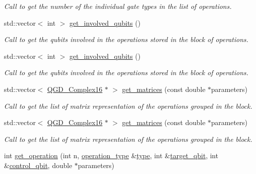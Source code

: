 \begin{DoxyCompactItemize}
\begin{DoxyCompactList}\small\item\em Call to get the number of the individual gate types in the list of operations. \end{DoxyCompactList}\item 
std\+::vector$<$ int $>$ \hyperlink{class_operation__block_a92e4f0566e4b36830652729377a8e936}{get\+\_\+involved\+\_\+qubits} ()
\begin{DoxyCompactList}\small\item\em Call to get the qubits involved in the operations stored in the block of operations. \end{DoxyCompactList}\item 
std\+::vector$<$ int $>$ \hyperlink{class_operation__block_aebdbb71e02ff6826d967d55f4cd4db28}{get\+\_\+involved\+\_\+qubits} ()
\begin{DoxyCompactList}\small\item\em Call to get the qubits involved in the operations stored in the block of operations. \end{DoxyCompactList}\item 
std\+::vector$<$ \hyperlink{struct_q_g_d___complex16}{Q\+G\+D\+\_\+\+Complex16} $\ast$ $>$ \hyperlink{class_operation__block_af3e794fd9a409978a414af539ad23320}{get\+\_\+matrices} (const double $\ast$parameters)
\begin{DoxyCompactList}\small\item\em Call to get the list of matrix representation of the operations grouped in the block. \end{DoxyCompactList}\item 
std\+::vector$<$ \hyperlink{struct_q_g_d___complex16}{Q\+G\+D\+\_\+\+Complex16} $\ast$ $>$ \hyperlink{class_operation__block_aedddbc5242eab7c00125359a835ac53d}{get\+\_\+matrices} (const double $\ast$parameters)
\begin{DoxyCompactList}\small\item\em Call to get the list of matrix representation of the operations grouped in the block. \end{DoxyCompactList}\item 
int \hyperlink{class_decomposition___base_a64e2b692d38fe3ccbd49708d8fa24493}{get\+\_\+operation} (int n, \hyperlink{operations_2include_2_operation_8h_ad99e62941c8e4b13e5fc45ecaaf65eff}{operation\+\_\+type} \&\hyperlink{class_operation_ad47c56c86d62a4c775571e1600416479}{type}, int \&\hyperlink{class_operation_a3e489b72c124b494777c71b1646bb1e9}{target\+\_\+qbit}, int \&\hyperlink{class_operation_a9a798ea8adec5a45fd2ca07996da88e1}{control\+\_\+qbit}, double $\ast$parameters)

\end{DoxyCompactItemize}
